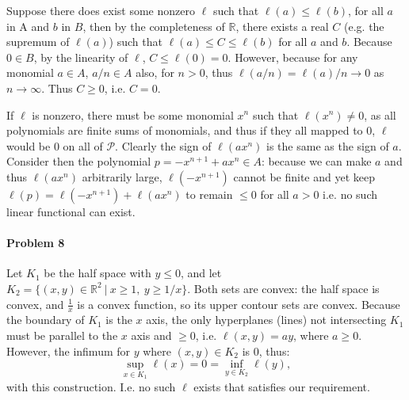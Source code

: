 \documentclass[12pt]{article}
\newcommand{\R}{\mathbb{R}}
\begin{document}
Suppose there does exist some nonzero $\ell$ such that $\ell(a) \leq \ell(b)$,
for all $a$ in A and $b$ in $B$,
then by the completeness of $\mathbb{R}$, there exists a real $C$ (e.g. the
supremum of $\ell(a)$) such that $\ell(a)\leq C\leq \ell(b)$ for all $a$ and
$b$. Because $0 \in B$, by the linearity of $\ell$, $C \leq \ell(0) = 0$.
However, because for any monomial $a \in A$, $a/n \in A$ also, for $n>0$, thus
$\ell(a/n) = \ell(a)/n \to 0$ as $n\to\infty$. Thus $C \geq 0$, i.e. $C = 0$.

If $\ell$ is nonzero, there must be some monomial $x^n$ such that $\ell(x^n) 
\neq 0$,
as all polynomials are finite sums of monomials, and thus if they all mapped
to 0, $\ell$ would be 0 on all of $\mathcal{P}$. Clearly the sign of $\ell(ax^n
)$ is the same as the sign of $a$. Consider then the polynomial $p = -x^{n+1}
+ax^n \in A$: because we can make $a$ and thus $\ell(ax^n)$
arbitrarily large, $\ell(-x^{n+1})$ cannot be finite and yet keep $\ell(p) = 
\ell(-x^{n+1}) + \ell(ax^n)$ to remain $\leq 0$ for all $a>0$ i.e. no such
linear functional can exist.

\paragraph{Problem 8}
Let $K_1$ be the half space with $y \leq 0$, and let $K_2 = \{(x,y) \in \R^2\
|\ x \geq 1,\ y \geq 1/x\}$. Both sets are convex: the half space is convex,
and $\frac{1}{x}$ is a convex function, so its upper contour sets are convex.
Because the boundary of $K_1$ is the $x$ axis,
the only hyperplanes (lines) not intersecting $K_1$ must be parallel to the $x$
axis and $\geq 0$, i.e. $\ell(x,y) = ay$, where $a \geq 0$. However, the infimum
for $y$ where $(x,y) \in K_2$ is 0, thus:
\begin{displaymath}
  \sup_{x\in K_1}\ell(x) = 0 = \inf_{y\in K_2}\ell(y),
\end{displaymath}
with this construction. I.e. no such $\ell$ exists that satisfies our
requirement.
\end{document}
